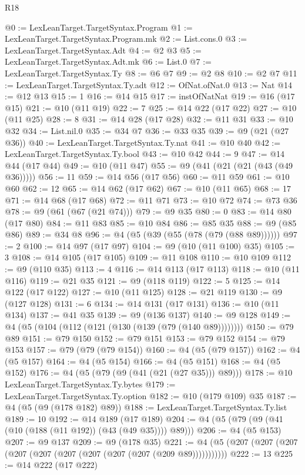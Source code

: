 \begin{lexlean}{R18}
\begin{coremodule}
@0 := LexLeanTarget.TargetSyntax.Program
@1 := LexLeanTarget.TargetSyntax.Program.mk
@2 := List.cons.{0}
@3 := LexLeanTarget.TargetSyntax.Adt
@4 := @2 @3
@5 := LexLeanTarget.TargetSyntax.Adt.mk
@6 := List.{0}
@7 := LexLeanTarget.TargetSyntax.Ty
@8 := @6 @7
@9 := @2 @8
@10 := @2 @7
@11 := LexLeanTarget.TargetSyntax.Ty.adt
@12 := OfNat.ofNat.{0}
@13 := Nat
@14 := @12 @13
@15 := 1
@16 := @14 @15
@17 := instOfNatNat
@19 := @16 (@17 @15)
@21 := @10 (@11 @19)
@22 := 7
@25 := @14 @22 (@17 @22)
@27 := @10 (@11 @25)
@28 := 8
@31 := @14 @28 (@17 @28)
@32 := @11 @31
@33 := @10 @32
@34 := List.nil.{0}
@35 := @34 @7
@36 := @33 @35
@39 := @9 (@21 (@27 @36))
@40 := LexLeanTarget.TargetSyntax.Ty.nat
@41 := @10 @40
@42 := LexLeanTarget.TargetSyntax.Ty.bool
@43 := @10 @42
@44 := 9
@47 := @14 @44 (@17 @44)
@49 := @10 (@11 @47)
@55 := @9 (@41 (@21 (@21 (@43 (@49 @36)))))
@56 := 11
@59 := @14 @56 (@17 @56)
@60 := @11 @59
@61 := @10 @60
@62 := 12
@65 := @14 @62 (@17 @62)
@67 := @10 (@11 @65)
@68 := 17
@71 := @14 @68 (@17 @68)
@72 := @11 @71
@73 := @10 @72
@74 := @73 @36
@78 := @9 (@61 (@67 (@21 @74)))
@79 := @9 @35
@80 := 0
@83 := @14 @80 (@17 @80)
@84 := @11 @83
@85 := @10 @84
@86 := @85 @35
@88 := @9 (@85 @86)
@89 := @34 @8
@96 := @4 (@5 (@39 (@55 (@78 (@79 (@88 @89))))))
@97 := 2
@100 := @14 @97 (@17 @97)
@104 := @9 (@10 (@11 @100) @35)
@105 := 3
@108 := @14 @105 (@17 @105)
@109 := @11 @108
@110 := @10 @109
@112 := @9 (@110 @35)
@113 := 4
@116 := @14 @113 (@17 @113)
@118 := @10 (@11 @116)
@119 := @21 @35
@121 := @9 (@118 @119)
@122 := 5
@125 := @14 @122 (@17 @122)
@127 := @10 (@11 @125)
@128 := @21 @119
@130 := @9 (@127 @128)
@131 := 6
@134 := @14 @131 (@17 @131)
@136 := @10 (@11 @134)
@137 := @41 @35
@139 := @9 (@136 @137)
@140 := @9 @128
@149 := @4 (@5 (@104 (@112 (@121 (@130 (@139 (@79 (@140 @89))))))))
@150 := @79 @89
@151 := @79 @150
@152 := @79 @151
@153 := @79 @152
@154 := @79 @153
@157 := @79 (@79 (@79 @154))
@160 := @4 (@5 (@79 @157))
@162 := @4 (@5 @157)
@164 := @4 (@5 @154)
@166 := @4 (@5 @151)
@168 := @4 (@5 @152)
@176 := @4 (@5 (@79 (@9 (@41 (@21 (@27 @35))) @89)))
@178 := @10 LexLeanTarget.TargetSyntax.Ty.bytes
@179 := LexLeanTarget.TargetSyntax.Ty.option
@182 := @10 (@179 @109) @35
@187 := @4 (@5 (@9 (@178 @182) @89))
@188 := LexLeanTarget.TargetSyntax.Ty.list
@189 := 10
@192 := @14 @189 (@17 @189)
@204 := @4 (@5 (@79 (@9 (@41 (@10 (@188 (@11 @192)) (@43 (@49 @35)))) @89)))
@206 := @4 (@5 @153)
@207 := @9 @137
@209 := @9 (@178 @35)
@221 := @4 (@5 (@207 (@207 (@207 (@207 (@207 (@207 (@207 (@207 (@207 (@209 @89)))))))))))
@222 := 13
@225 := @14 @222 (@17 @222)

\end{coremodule}
\end{lexlean}
